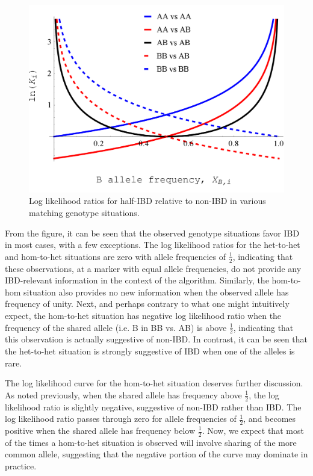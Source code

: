 \documentclass{article}
\begin{document}
\begin{figure}[h!]
\noindent
\centering
\includegraphics[scale=0.20]{llrs_rev2c}
\caption{Log likelihood ratios for half-IBD relative to non-IBD in various matching genotype situations.}
\label{fig:llrs}
\end{figure}

From the figure, it can be seen that the observed genotype situations favor IBD in most cases, with a few exceptions. The log likelihood ratios for the het-to-het and hom-to-het situations are zero with allele frequencies of $\frac{1}{2}$, indicating that these observations, at a marker with equal allele frequencies, do not provide any IBD-relevant information in the context of the algorithm. Similarly, the hom-to-hom situation also provides no new information when the observed allele has frequency of unity. Next, and perhaps contrary to what one might intuitively expect, the hom-to-het situation has negative log likelihood ratio when the frequency of the shared allele (i.e. B in BB vs. AB) is above $\frac{1}{2}$, indicating that this observation is actually suggestive of non-IBD. In contrast, it can be seen that the het-to-het situation is strongly suggestive of IBD when one of the alleles is rare.

The log likelihood curve for the hom-to-het situation deserves further discussion. As noted previously, when the shared allele has frequency above $\frac{1}{2}$, the log likelihood ratio is slightly negative, suggestive of non-IBD rather than IBD. The log likelihood ratio passes through zero for allele frequencies of $\frac{1}{2}$, and becomes positive when the shared allele has frequency below $\frac{1}{2}$. Now, we expect that most of the times a hom-to-het situation is observed will involve sharing of the more common allele, suggesting that the negative portion of the curve may dominate in practice. 
\end{document}
